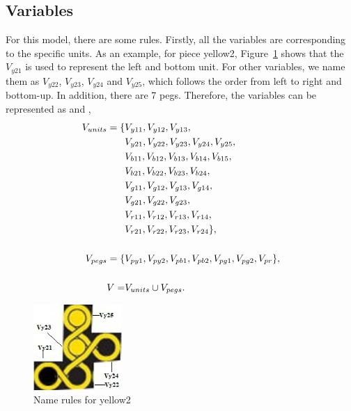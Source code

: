 \subsection{Variables}
 For this model, there are some rules. Firstly, all the variables are corresponding to the specific units. As an example, for piece yellow2, Figure~\ref{fig:namerules} shows that the $V_{y21}$ is used to represent the left and bottom unit. For other variables, we name them as $V_{y22}$, $V_{y23}$, $V_{y24}$ and $V_{y25}$, which follows the order from left to right and bottom-up. In addition, there are 7 pegs. Therefore, the variables can be represented as \VUnits and \VPegs,
\begin{equation}
\begin{aligned}
V_{units}=\{&V_{y11},V_{y12},V_{y13},\\&V_{y21},V_{y22},V_{y23},V_{y24},V_{y25},\\&V_{b11},V_{b12},V_{b13},V_{b14},
V_{b15},\\&V_{b21},V_{b22},V_{b23},V_{b24},\\&V_{g11},V_{g12},V_{g13},V_{g14},\\&V_{g21},V_{g22},V_{g23},\\&V_{r11},
V_{r12},V_{r13},V_{r14},\\&V_{r21},V_{r22},V_{r23},V_{r24}\},\\
\\V_{pegs} = \{&V_{py1}, V_{py2}, V_{pb1}, V_{pb2}, V_{pg1}, V_{pg2}, V_{pr}\},\\
\\V = &V_{units} \cup V_{pegs}.
\end{aligned}
\end{equation}
\begin{figure}[htbp]
    \centering
    \includegraphics[width=0.3\textwidth]{figs/example.jpg}
    \caption{Name rules for yellow2}
    \label{fig:namerules}
\end{figure}
